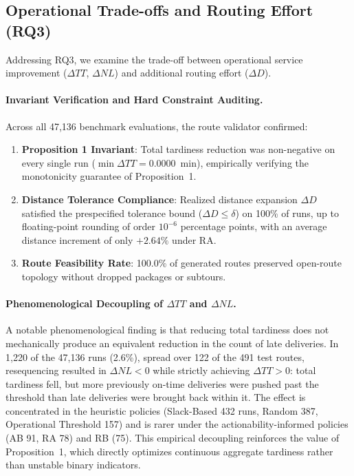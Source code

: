 \documentclass[11pt,a4paper]{article}
\begin{document}
\subsection{Operational Trade-offs and Routing Effort (RQ3)}\label{sec:res-rq3}

Addressing RQ3, we examine the trade-off between operational service improvement ($\Delta TT$, $\Delta NL$) and additional routing effort ($\Delta D$).

\paragraph{Invariant Verification and Hard Constraint Auditing.}
Across all 47,136 benchmark evaluations, the route validator confirmed:
\begin{enumerate}
    \item \textbf{Proposition 1 Invariant}: Total tardiness reduction was non-negative on every single run ($\min \Delta TT = 0.0000$~min), empirically verifying the monotonicity guarantee of Proposition~1.
    \item \textbf{Distance Tolerance Compliance}: Realized distance expansion $\Delta D$ satisfied the prespecified tolerance bound ($\Delta D \le \delta$) on 100\% of runs, up to floating-point rounding of order $10^{-6}$ percentage points, with an average distance increment of only $+2.64\%$ under RA.
    \item \textbf{Route Feasibility Rate}: 100.0\% of generated routes preserved open-route topology without dropped packages or subtours.
\end{enumerate}

\paragraph{Phenomenological Decoupling of $\Delta TT$ and $\Delta NL$.}
A notable phenomenological finding is that reducing total tardiness does not mechanically produce an equivalent reduction in the count of late deliveries. In 1,220 of the 47,136 runs (2.6\%), spread over 122 of the 491 test routes, resequencing resulted in $\Delta NL < 0$ while strictly achieving $\Delta TT > 0$: total tardiness fell, but more previously on-time deliveries were pushed past the threshold than late deliveries were brought back within it. The effect is concentrated in the heuristic policies (Slack-Based 432 runs, Random 387, Operational Threshold 157) and is rarer under the actionability-informed policies (AB 91, RA 78) and RB (75). This empirical decoupling reinforces the value of Proposition~1, which directly optimizes continuous aggregate tardiness rather than unstable binary indicators.
\end{document}
